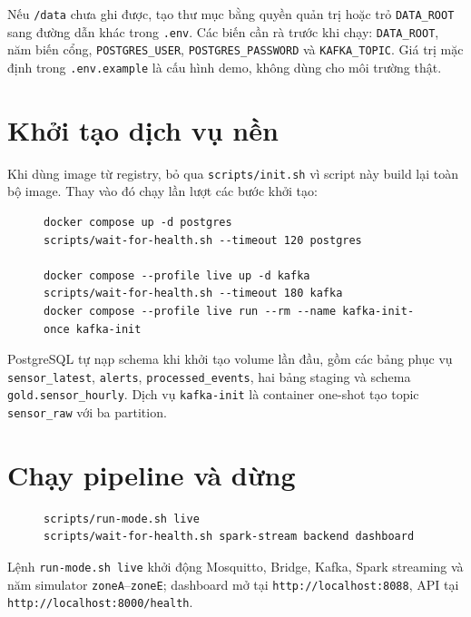 Nếu \texttt{/data} chưa ghi được, tạo thư mục bằng quyền quản trị hoặc trỏ
\texttt{DATA\_ROOT} sang đường dẫn khác trong \texttt{.env}. Các biến cần rà
trước khi chạy: \texttt{DATA\_ROOT}, năm biến cổng, \texttt{POSTGRES\_USER},
\texttt{POSTGRES\_PASSWORD} và \texttt{KAFKA\_TOPIC}. Giá trị mặc định trong
\texttt{.env.example} là cấu hình demo, không dùng cho môi trường thật.

\section{Khởi tạo dịch vụ nền}

Khi dùng image từ registry, bỏ qua \texttt{scripts/init.sh} vì script này build
lại toàn bộ image. Thay vào đó chạy lần lượt các bước khởi tạo:

\begin{figure}[H]
\label{lst:init-services}
\begin{lstlisting}[basicstyle=\ttfamily\footnotesize,frame=single]
docker compose up -d postgres
scripts/wait-for-health.sh --timeout 120 postgres

docker compose --profile live up -d kafka
scripts/wait-for-health.sh --timeout 180 kafka
docker compose --profile live run --rm --name kafka-init-once kafka-init
\end{lstlisting}
\end{figure}

PostgreSQL tự nạp schema khi khởi tạo volume lần đầu, gồm các bảng phục vụ
\texttt{sensor\_latest}, \texttt{alerts}, \texttt{processed\_events}, hai bảng
staging và schema \texttt{gold.sensor\_hourly}. Dịch vụ \texttt{kafka-init} là
container one-shot tạo topic \texttt{sensor\_raw} với ba partition.

\section{Chạy pipeline và dừng}

\begin{figure}[H]
\label{lst:run-live}
\begin{lstlisting}[basicstyle=\ttfamily\footnotesize,frame=single]
scripts/run-mode.sh live
scripts/wait-for-health.sh spark-stream backend dashboard
\end{lstlisting}
\end{figure}

Lệnh \texttt{run-mode.sh live} khởi động Mosquitto, Bridge, Kafka, Spark
streaming và năm simulator \texttt{zoneA}--\texttt{zoneE}; dashboard mở tại
\texttt{http://localhost:8088}, API tại \texttt{http://localhost:8000/health}.

